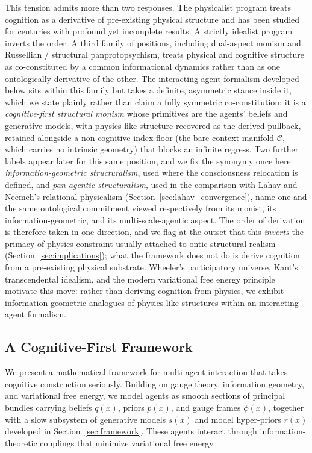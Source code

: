 \documentclass[11pt]{article}
\begin{document}
This tension admits more than two responses. The physicalist program treats cognition as a derivative of pre-existing physical structure and has been studied for centuries with profound yet incomplete results. A strictly idealist program inverts the order. A third family of positions, including dual-aspect monism and Russellian / structural panprotopsychism, treats physical and cognitive structure as co-constituted by a common informational dynamics rather than as one ontologically derivative of the other. The interacting-agent formalism developed below sits within this family but takes a definite, asymmetric stance inside it, which we state plainly rather than claim a fully symmetric co-constitution: it is a \emph{cognitive-first structural monism} whose primitives are the agents' beliefs and generative models, with physics-like structure recovered as the derived pullback, retained alongside a non-cognitive index floor (the bare context manifold $\mathcal{C}$, which carries no intrinsic geometry) that blocks an infinite regress. Two further labels appear later for this same position, and we fix the synonymy once here: \emph{information-geometric structuralism}, used where the consciousness relocation is defined, and \emph{pan-agentic structuralism}, used in the comparison with Lahav and Neemeh's relational physicalism (Section~\ref{sec:lahav_convergence}), name one and the same ontological commitment viewed respectively from its monist, its information-geometric, and its multi-scale-agentic aspect. The order of derivation is therefore taken in one direction, and we flag at the outset that this \emph{inverts} the primacy-of-physics constraint usually attached to ontic structural realism (Section~\ref{sec:implications}); what the framework does not do is derive cognition from a pre-existing physical substrate. Wheeler's participatory universe, Kant's transcendental idealism, and the modern variational free energy principle motivate this move: rather than deriving cognition from physics, we exhibit information-geometric analogues of physics-like structures within an interacting-agent formalism.

\subsection{A Cognitive-First Framework}
\label{sec:cognitive_first}

We present a mathematical framework for multi-agent interaction that takes cognitive construction seriously. Building on gauge theory, information geometry, and variational free energy, we model agents as smooth sections of principal bundles carrying beliefs $q(x)$, priors $p(x)$, and gauge frames $\phi(x)$, together with a slow subsystem of generative models $s(x)$ and model hyper-priors $r(x)$ developed in Section~\ref{sec:framework}. These agents interact through information-theoretic couplings that minimize variational free energy.
\end{document}

